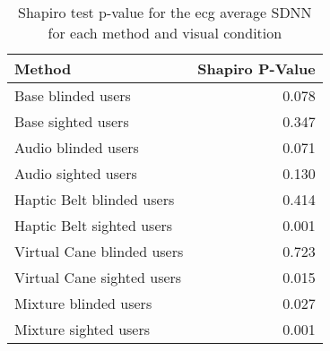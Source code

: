 
\begin{table}[!htb]
\centering
\caption{Shapiro test p-value for the ecg average SDNN for each method and visual condition}
\label{tab:shapiro_ecg_sdnn}
\begin{tabular}{lr}
\toprule
                    Method &  Shapiro P-Value \\
\midrule
        Base blinded users &            0.078 \\
        Base sighted users &            0.347 \\
       Audio blinded users &            0.071 \\
       Audio sighted users &            0.130 \\
 Haptic Belt blinded users &            0.414 \\
 Haptic Belt sighted users &            0.001 \\
Virtual Cane blinded users &            0.723 \\
Virtual Cane sighted users &            0.015 \\
     Mixture blinded users &            0.027 \\
     Mixture sighted users &            0.001 \\
\bottomrule
\end{tabular}
\end{table}


